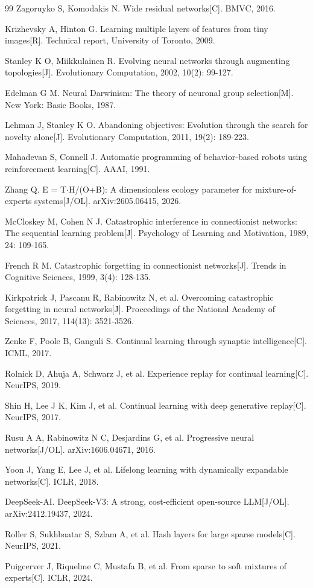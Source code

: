 \documentclass[twoside]{article}
\theoremstyle{definition}
\begin{document}
\begin{thebibliography}{99}
 Zagoruyko S, Komodakis N. Wide residual networks[C]. BMVC, 2016.

 Krizhevsky A, Hinton G. Learning multiple layers of features from tiny images[R]. Technical report, University of Toronto, 2009.

 Stanley K O, Miikkulainen R. Evolving neural networks through augmenting topologies[J]. Evolutionary Computation, 2002, 10(2): 99-127.

 Edelman G M. Neural Darwinism: The theory of neuronal group selection[M]. New York: Basic Books, 1987.

 Lehman J, Stanley K O. Abandoning objectives: Evolution through the search for novelty alone[J]. Evolutionary Computation, 2011, 19(2): 189-223.

 Mahadevan S, Connell J. Automatic programming of behavior-based robots using reinforcement learning[C]. AAAI, 1991.

 Zhang Q. E = T\ensuremath{\cdot}H/(O+B): A dimensionless ecology parameter for mixture-of-experts systems[J/OL]. arXiv:2605.06415, 2026.

 McCloskey M, Cohen N J. Catastrophic interference in connectionist networks: The sequential learning problem[J]. Psychology of Learning and Motivation, 1989, 24: 109-165.

 French R M. Catastrophic forgetting in connectionist networks[J]. Trends in Cognitive Sciences, 1999, 3(4): 128-135.

 Kirkpatrick J, Pascanu R, Rabinowitz N, et al. Overcoming catastrophic forgetting in neural networks[J]. Proceedings of the National Academy of Sciences, 2017, 114(13): 3521-3526.

 Zenke F, Poole B, Ganguli S. Continual learning through synaptic intelligence[C]. ICML, 2017.

 Rolnick D, Ahuja A, Schwarz J, et al. Experience replay for continual learning[C]. NeurIPS, 2019.

 Shin H, Lee J K, Kim J, et al. Continual learning with deep generative replay[C]. NeurIPS, 2017.

 Rusu A A, Rabinowitz N C, Desjardins G, et al. Progressive neural networks[J/OL]. arXiv:1606.04671, 2016.

 Yoon J, Yang E, Lee J, et al. Lifelong learning with dynamically expandable networks[C]. ICLR, 2018.

 DeepSeek-AI. DeepSeek-V3: A strong, cost-efficient open-source LLM[J/OL]. arXiv:2412.19437, 2024.

 Roller S, Sukhbaatar S, Szlam A, et al. Hash layers for large sparse models[C]. NeurIPS, 2021.

 Puigcerver J, Riquelme C, Mustafa B, et al. From sparse to soft mixtures of experts[C]. ICLR, 2024.

\end{thebibliography}
\end{document}
